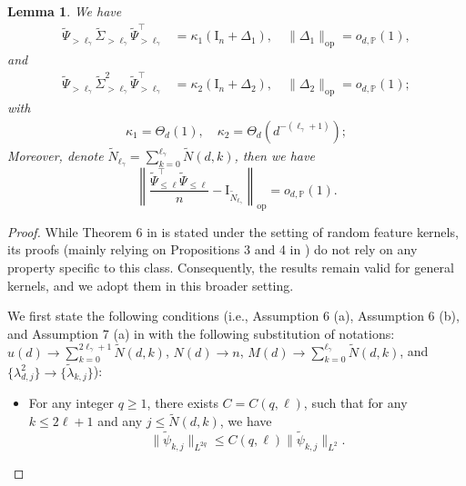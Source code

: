 \documentclass{article}
\theoremstyle{plain}
\newtheorem{lemma}[theorem]{Lemma}
\theoremstyle{definition}
\theoremstyle{remark}
\begin{document}
\begin{appendix}
\begin{lemma}\label{lemma psi psi top_general}
   We have
    \begin{equation}\label{eq k ge l in lemma_general_1}
    \begin{aligned}
        \tilde{\Psi}_{>\ell_{\gamma}} \tilde{\Sigma}_{>\ell_{\gamma}} \tilde{\Psi}_{>\ell_{\gamma}}^{\top} &= \kappa_1 \left(\mathrm{I}_{n} + \Delta_{1}\right), \quad \|\Delta_{1}\|_{\mathrm{op}} = o_{d, \mathbb{P}}(1),
    \end{aligned}
    \end{equation}
    and
    \begin{equation}\label{eq k ge l in lemma_general_2}
    \begin{aligned}
        \tilde{\Psi}_{>\ell_{\gamma}} \tilde{\Sigma}_{>\ell_{\gamma}}^{2} \tilde{\Psi}_{>\ell_{\gamma}}^{\top} &= \kappa_2 \left(\mathrm{I}_{n} + \Delta_{2}\right), \quad \|\Delta_{2}\|_{\mathrm{op}} = o_{d, \mathbb{P}}(1);
    \end{aligned}
    \end{equation}
    with
    \begin{align*}
    \kappa_{1} = \Theta_{d}(1), \quad \kappa_{2} = \Theta_{d}\left( d^{-(\ell_{\gamma}+1)} \right);
\end{align*}
Moreover, denote $\tilde{N}_{\ell_{\gamma}} = \sum_{k=0}^{\ell_{\gamma}}\tilde{N}(d, k)$, then we have
    \begin{equation}\label{eq k ge l in lemma_general_3}
         \left\| \frac{\tilde{\Psi}_{\leq \ell}^{\top} \tilde{\Psi}_{\leq \ell} }{n} - \mathrm{I}_{\tilde{N}_{\ell_{\gamma}}} \right\|_{\mathrm{op}} = o_{d, \mathbb{P}}(1).
    \end{equation}
\end{lemma}
\begin{proof}
While Theorem 6 in \cite{mei2022generalization} is stated under the setting of random feature kernels, its proofs (mainly relying on Propositions 3 and 4 in \cite{mei2022generalization}) do not rely on any property specific to this class. Consequently, the results remain valid for general kernels, and we adopt them in this broader setting.

We first state the following conditions (i.e., Assumption 6 (a), Assumption 6 (b), and Assumption 7 (a) in \cite{mei2022generalization} with the following substitution of notations: $u(d) \to \sum_{k=0}^{2\ell_{\gamma} +1}\tilde{N}(d, k)$, $N(d) \to n$, $M(d) \to \sum_{k=0}^{\ell_{\gamma}}\tilde{N}(d, k)$, and $\{\lambda_{d, j}^2\} \to \{\tilde{\lambda}_{k, j}\}$):
\begin{itemize}
    \item For any integer $q \geq 1$, there exists $C=C(q, \ell)$, such that for any $k \leq 2\ell + 1$ and any $j \leq \tilde{N}(d, k)$, we have
\begin{equation}\label{eqn_condi_general_1}
 \|\tilde{\psi}_{k, j}\|_{L^{2q}} \leq C(q, \ell) \|\tilde{\psi}_{k, j}\|_{L^{2}}.
    \end{equation}


\end{itemize}
\end{proof}
\end{appendix}
\end{document}
